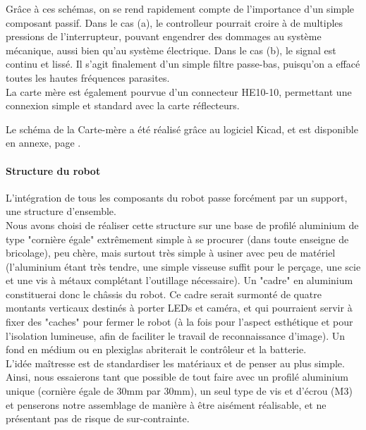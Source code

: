 			Grâce à ces schémas, on se rend rapidement compte de l'importance d'un simple composant passif. Dans le cas (a), le controlleur pourrait croire à de multiples pressions de l'interrupteur, pouvant engendrer des dommages au système mécanique, aussi bien qu'au système électrique. Dans le cas (b), le signal est continu et lissé. Il s'agit finalement d'un simple filtre passe-bas, puisqu'on a effacé toutes les hautes fréquences parasites.\\
			La carte mère est également pourvue d'un connecteur HE10-10, permettant une connexion simple et standard avec la carte réflecteurs. 
			
			Le schéma de la Carte-mère a été réalisé grâce au logiciel Kicad, et est disponible en annexe, page \pageref{schemasCarteMere}.

		\paragraph{Structure du robot}

			L'intégration de tous les composants du robot passe forcément par un support, une structure d'ensemble.\\
			Nous avons choisi de réaliser cette structure sur une base de profilé aluminium de type "cornière égale" extrêmement simple à se procurer (dans toute enseigne de bricolage), peu chère, mais surtout très simple à usiner avec peu de matériel (l'aluminium étant très tendre, une simple visseuse suffit pour le perçage, une scie et une vis à métaux complétant l'outillage nécessaire).
			Un "cadre" en aluminium constituerai donc le châssis du robot. Ce cadre serait surmonté de quatre montants verticaux destinés à porter LEDs et caméra, et qui pourraient servir à fixer des "caches" pour fermer le robot (à la fois pour l'aspect esthétique et pour l'isolation lumineuse, afin de faciliter le travail de reconnaissance d'image). Un fond en médium ou en plexiglas abriterait le contrôleur et la batterie.\\

			L'idée maîtresse est de standardiser les matériaux et de penser au plus simple. Ainsi, nous essaierons tant que possible de tout faire avec un profilé aluminium unique (cornière égale de 30mm par 30mm), un seul type de vis et d'écrou (M3) et penserons notre assemblage de manière à être aisément réalisable, et ne présentant pas de risque de sur-contrainte.\\

